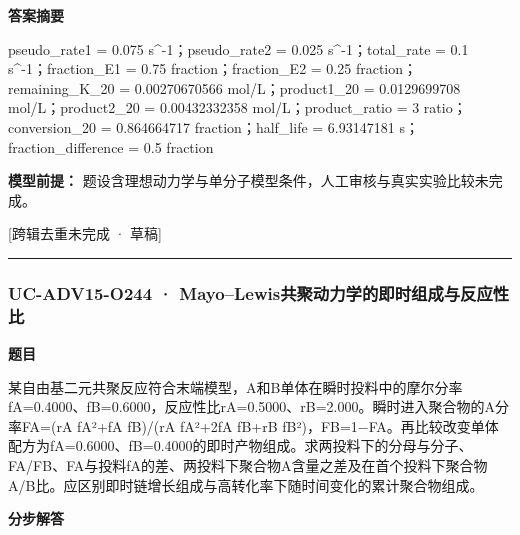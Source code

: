 \documentclass[UTF8,11pt,a4paper]{ctexart}
\begin{document}
\noindent\textbf{答案摘要}\par
pseudo\_rate1 = 0.075 s\textasciicircum{}-1；pseudo\_rate2 = 0.025 s\textasciicircum{}-1；total\_rate = 0.1 s\textasciicircum{}-1；fraction\_E1 = 0.75 fraction；fraction\_E2 = 0.25 fraction；remaining\_K\_20 = 0.00270670566 mol/L；product1\_20 = 0.0129699708 mol/L；product2\_20 = 0.00432332358 mol/L；product\_ratio = 3 ratio；conversion\_20 = 0.864664717 fraction；half\_life = 6.93147181 s；fraction\_difference = 0.5 fraction\par
\noindent\textbf{模型前提：}
题设含理想动力学与单分子模型条件，人工审核与真实实验比较未完成。\par
\noindent\textcolor{red!65!black}{[跨辑去重未完成 · 草稿]} \par
\medskip\hrule\medskip
{}
\subsubsection*{UC-ADV15-O244 · Mayo–Lewis共聚动力学的即时组成与反应性比}
\noindent\textbf{题目}\par
某自由基二元共聚反应符合末端模型，A和B单体在瞬时投料中的摩尔分率fA=0.4000、fB=0.6000，反应性比rA=0.5000、rB=2.000。瞬时进入聚合物的A分率FA=(rA fA²+fA fB)/(rA fA²+2fA fB+rB fB²)，FB=1−FA。再比较改变单体配方为fA=0.6000、fB=0.4000的即时产物组成。求两投料下的分母与分子、FA/FB、FA与投料fA的差、两投料下聚合物A含量之差及在首个投料下聚合物A/B比。应区别即时链增长组成与高转化率下随时间变化的累计聚合物组成。\par
\medskip\noindent\textbf{分步解答}
\end{document}
